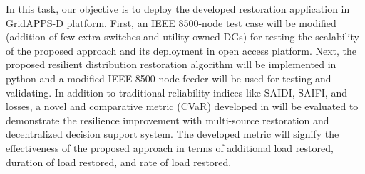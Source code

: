 \documentclass[12pt]{article}
\begin{document}
 In this task, our objective is to deploy the developed restoration application in GridAPPS-D platform. First, an IEEE 8500-node test case will be modified (addition of few extra switches and utility-owned DGs) for testing the scalability of the proposed approach and its deployment in open access platform. Next, the proposed resilient distribution restoration algorithm will be implemented in python and a modified IEEE 8500-node feeder will be used for testing and validating. In addition to traditional reliability indices like SAIDI, SAIFI, and losses, a novel and comparative metric (CVaR) developed in \cite{poudel2019tre} will be evaluated to demonstrate the resilience improvement with multi-source restoration and decentralized decision support system. The developed metric will signify the effectiveness of the proposed approach in terms of additional load restored, duration of load restored, and rate of load restored.



\end{document}
